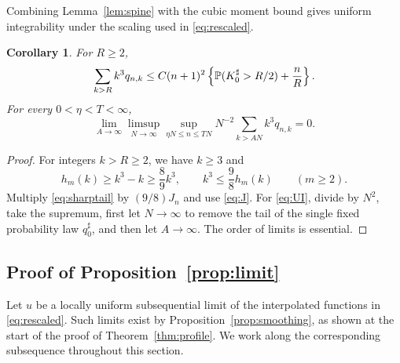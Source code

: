 \documentclass[11pt,letterpaper,reqno]{amsart}
\numberwithin{equation}{section}
\theoremstyle{plain}
\newtheorem{corollary}[theorem]{Corollary}
\theoremstyle{remark}
\begin{document}
Combining Lemma~\ref{lem:spine} with the cubic moment bound gives uniform integrability under the scaling used in \eqref{eq:rescaled}.
\begin{corollary}\label{cor:thirdtail}
For $R\ge2$,
\begin{equation}\label{eq:thirdtail}
 \sum_{k>R}k^3q_{n,k}
 \le C(n+1)^2\left\{ \mathbb P(K^\sharp_0>R/2)+\frac nR\right\}.
\end{equation}
For every $0<\eta<T<\infty$,
\begin{equation}\label{eq:UI}
 \lim_{A\to\infty}\limsup_{N\to\infty}
 \sup_{\eta N\le n\le TN}N^{-2}\sum_{k>AN}k^3q_{n,k}=0.
\end{equation}
\end{corollary}
\begin{proof}
For integers $k>R\ge2$, we have $k\ge3$ and
\[
 h_m(k)\ge k^3-k\ge\frac89k^3,
 \qquad k^3\le\frac98h_m(k)\qquad(m\ge2).
\]
Multiply \eqref{eq:sharptail} by $(9/8)J_n$ and use \eqref{eq:J}. For \eqref{eq:UI}, divide by $N^2$, take the supremum, first let $N\to\infty$ to remove the tail of the single fixed probability law $q_0^\sharp$, and then let $A\to\infty$. The order of limits is essential.
\end{proof}

\subsection{Proof of Proposition~\ref{prop:limit}} \label{subsec:prop:limit_proof}
Let $u$ be a locally uniform subsequential limit of the interpolated functions in \eqref{eq:rescaled}. Such limits exist by Proposition~\ref{prop:smoothing}, as shown at the start of the proof of Theorem~\ref{thm:profile}. We work along the corresponding subsequence throughout this section.
\end{document}
